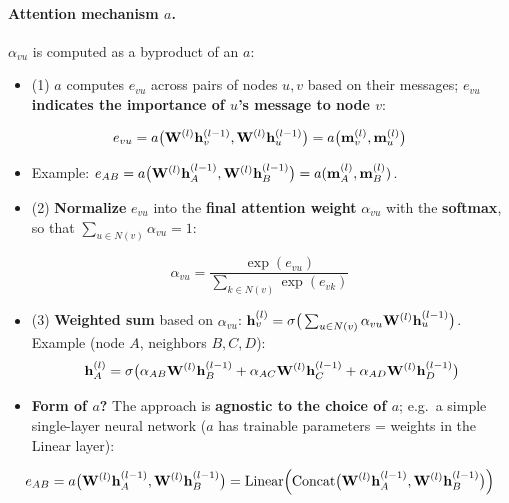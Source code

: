 \paragraph{Attention mechanism $a$.} $\alpha_{vu}$ is computed as a byproduct
of an  $a$:
\begin{itemize}
  \item (1) $a$ computes  $e_{vu}$ across pairs of
    nodes $u,v$ based on their messages; \textbf{$e_{vu}$ indicates the
    importance of $u$'s message to node $v$}:
\end{itemize}
\begin{equation}\label{eq:lec04-gat-e}
  e_{vu} = a\big(\mathbf{W}^{(l)}\mathbf{h}_v^{(l-1)}, \mathbf{W}^{(l)}\mathbf{h}_u^{(l-1)}\big)
         = a\big(\mathbf{m}_v^{(l)}, \mathbf{m}_u^{(l)}\big)
\end{equation}
\begin{itemize}
  \item[] Example: $e_{AB} = a\big(\mathbf{W}^{(l)}\mathbf{h}_A^{(l-1)}, \mathbf{W}^{(l)}\mathbf{h}_B^{(l-1)}\big)
    = a(\mathbf{m}_A^{(l)},\mathbf{m}_B^{(l)})$.
\end{itemize}
\begin{itemize}
  \item (2) \textbf{Normalize} $e_{vu}$ into the \textbf{final attention weight}
    $\alpha_{vu}$ with the \textbf{softmax}, so that $\sum_{u\in N(v)}\alpha_{vu}=1$:
\end{itemize}
\begin{equation}\label{eq:lec04-gat-alpha}
  \alpha_{vu} = \frac{\exp(e_{vu})}{\sum_{k\in N(v)}\exp(e_{vk})}
\end{equation}
\begin{itemize}
  \item (3) \textbf{Weighted sum} based on $\alpha_{vu}$:
    $\mathbf{h}_v^{(l)} = \sigma\big(\sum_{u\in N(v)}\alpha_{vu}\mathbf{W}^{(l)}\mathbf{h}_u^{(l-1)}\big)$.
    Example (node $A$, neighbors $B,C,D$):
    \[
      \mathbf{h}_A^{(l)} = \sigma\big(\alpha_{AB}\mathbf{W}^{(l)}\mathbf{h}_B^{(l-1)}
        + \alpha_{AC}\mathbf{W}^{(l)}\mathbf{h}_C^{(l-1)} + \alpha_{AD}\mathbf{W}^{(l)}\mathbf{h}_D^{(l-1)}\big)
    \]
  \item \textbf{Form of $a$?} The approach is \textbf{agnostic to the choice of
    $a$}; e.g.\ a simple single-layer neural network ($a$ has trainable
    parameters = weights in the Linear layer):
\end{itemize}
\begin{equation}\label{eq:lec04-gat-linear}
  e_{AB} = a\big(\mathbf{W}^{(l)}\mathbf{h}_A^{(l-1)}, \mathbf{W}^{(l)}\mathbf{h}_B^{(l-1)}\big)
         = \mathrm{Linear}\Big(\mathrm{Concat}\big(\mathbf{W}^{(l)}\mathbf{h}_A^{(l-1)}, \mathbf{W}^{(l)}\mathbf{h}_B^{(l-1)}\big)\Big)
\end{equation}
